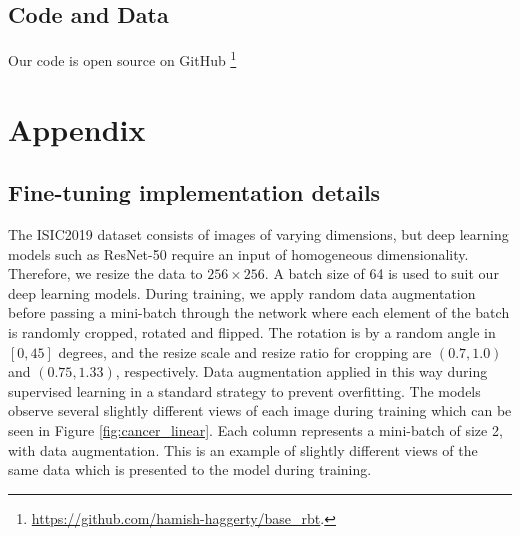\documentclass[a4paper,fleqn]{cas-dc}
\begin{document}
\subsection*{Code and Data}

Our code is open source on GitHub \footnote{\url{https://github.com/hamish-haggerty/base_rbt}.} %


 




%



\clearpage
\appendix
\section{Appendix}
\subsection{Fine-tuning implementation details}
\label{sec:fine_tuning_details}
The ISIC2019 dataset consists of images of varying dimensions, but deep learning models such as ResNet-50 require an input of homogeneous dimensionality. Therefore, we resize the data to $256\times256$. A batch size of 64 is used to suit our deep learning models. During training,   we apply random data augmentation before passing a mini-batch through the network where each element of the batch is randomly cropped, rotated and flipped. The rotation is by a random angle in $[0,45]$ degrees, and the resize scale and resize ratio for cropping are $(0.7, 1.0)$ and $(0.75, 1.33)$, respectively. Data augmentation applied in this way during supervised learning in a standard strategy to prevent overfitting. The models observe several slightly different views of each image during training which can be seen in Figure \ref{fig:cancer_linear}. Each column represents a mini-batch of size 2, with data augmentation. This is an example of slightly different views of the same data which is presented to the model during training.
\end{document}
